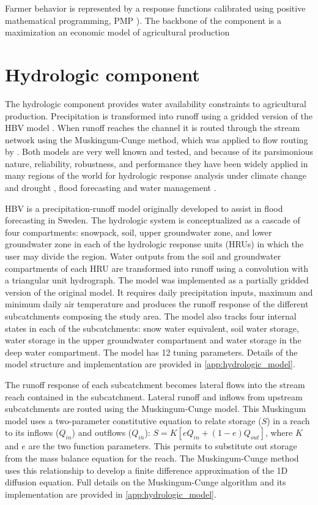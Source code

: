 \documentclass[review]{elsarticle}
\begin{document}
Farmer behavior is represented by a response functions calibrated using positive mathematical programming, PMP \citep{Howitt1995}). The backbone of the component is a maximization an economic model of agricultural production   

\section{Hydrologic component}

The hydrologic component provides water availability constraints to agricultural production. Precipitation is transformed into runoff using a gridded version of the HBV model \citep{Bergstrom1973, Bergstrom1995, Lindstrom1997}. When runoff reaches the channel it is routed through the stream network using the Muskingum-Cunge method, which was applied to flow routing by \cite{Cunge1969}. Both models are very well known and tested, and because of its parsimonious nature, reliability, robustness, and performance they have been widely applied in many regions of the world for hydrologic response analysis under climate change and drought \citep{Driessen2010, Menzel2002}, flood    forecasting \citep{}  and water management \citep{}. 

HBV is a precipitation-runoff model originally developed to assist in flood forecasting in Sweden. The hydrologic system is conceptualized as a cascade of four compartments: snowpack, soil, upper groundwater zone, and lower groundwater zone in each of the hydrologic response units (HRUs) in which the user may divide the region. Water outputs from the soil and groundwater compartments of each HRU are transformed into runoff using a convolution with a triangular unit hydrograph. The model was implemented as a partially gridded version of the original model. It requires daily precipitation inputs, maximum and minimum daily air temperature and produces the runoff response of the different subcatchments composing the study area. The model also tracks four internal states in each of the subcatchments: snow water equivalent, soil water storage, water storage in the upper groundwater compartment and water storage in the deep water compartment. The model has \num{12} tuning parameters. Details of the model structure and implementation are provided in \ref{app:hydrologic_model}. 

The runoff response of each subcatchment becomes lateral flows into the stream reach contained in the subcatchment. Lateral runoff and inflows from upstream subcatchments are routed using the Muskingum-Cunge model. This Muskingum model uses a two-parameter constitutive equation to relate storage ($S$) in a reach to its inflows ($Q_{in}$) and outflows ($Q_{in}$): $S = K\left[eQ_{in} + (1 - e)Q_{out}\right]$, where $K$ and $e$ are the two function parameters.  This permits to substitute out storage from the mass balance equation for the reach. The Muskingum-Cunge method uses this relationship to develop a finite difference approximation of the 1D diffusion equation. 
Full details on the Muskingum-Cunge algorithm and its implementation  are provided in \ref{app:hydrologic_model}. 
\end{document}
